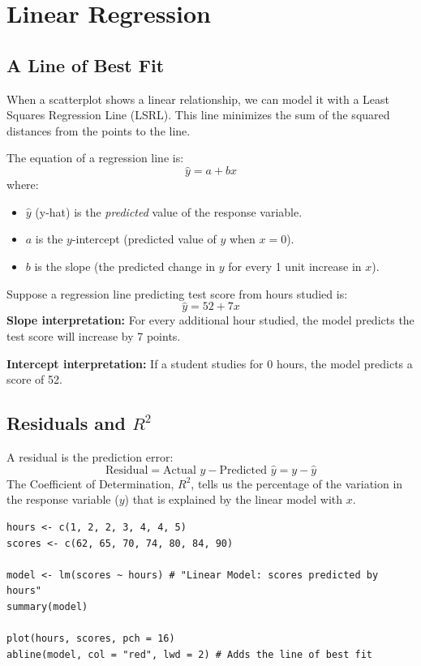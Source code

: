 \documentclass[11pt,openany]{book}
\begin{document}
\chapter{Linear Regression}

\section{A Line of Best Fit}
When a scatterplot shows a linear relationship, we can model it with a Least Squares Regression Line (LSRL). This line minimizes the sum of the squared distances from the points to the line.

The equation of a regression line is:
\[
\hat{y} = a + bx
\]
where:
\begin{itemize}
    \item $\hat{y}$ (y-hat) is the \textit{predicted} value of the response variable.
    \item $a$ is the $y$-intercept (predicted value of $y$ when $x=0$).
    \item $b$ is the slope (the predicted change in $y$ for every 1 unit increase in $x$).
\end{itemize}

\begin{examplebox}
Suppose a regression line predicting test score from hours studied is:
\[
\hat{y} = 52 + 7x
\]
\textbf{Slope interpretation:} For every additional hour studied, the model predicts the test score will increase by 7 points.

\textbf{Intercept interpretation:} If a student studies for 0 hours, the model predicts a score of 52.
\end{examplebox}

\section{Residuals and $R^2$}
A residual is the prediction error:
\[
\text{Residual} = \text{Actual } y - \text{Predicted } \hat{y} = y - \hat{y}
\]
The Coefficient of Determination, \textbf{$R^2$}, tells us the percentage of the variation in the response variable ($y$) that is explained by the linear model with $x$.

\begin{rstudio}
\begin{lstlisting}[style=rcode]
hours <- c(1, 2, 2, 3, 4, 4, 5)
scores <- c(62, 65, 70, 74, 80, 84, 90)

model <- lm(scores ~ hours) # "Linear Model: scores predicted by hours"
summary(model)

plot(hours, scores, pch = 16)
abline(model, col = "red", lwd = 2) # Adds the line of best fit
\end{lstlisting}
\end{rstudio}
\end{document}
